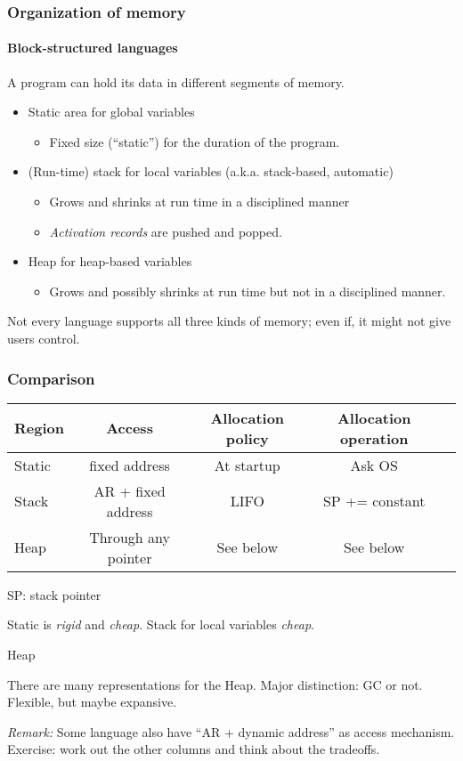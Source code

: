 \documentclass{beamer}
\newcommand{\Blue}[1]{\color{blue}#1\color{black}}
\begin{document}
\begin{frame}[fragile]
\frametitle{Organization of memory}
\framesubtitle{Block-structured languages}
A program can hold its data in different segments of memory.
\begin{itemize}
\item Static area for global variables
\begin{itemize}
\item Fixed size (``static'') for the duration of 
the program.
\end{itemize} 
\item (Run-time) stack for local variables (a.k.a. stack-based, automatic)
\begin{itemize}
\item  Grows and shrinks at run time in a disciplined
manner
\item  \emph{Activation records} are pushed and popped. 
\end{itemize}

\item Heap for heap-based variables
\begin{itemize}
\item Grows and possibly shrinks at run time but not
in a disciplined manner. 
\end{itemize}
\end{itemize}
Not every language supports all three kinds of memory; even if,
it might not give users control. 
\end{frame}


\begin{frame}[fragile]
\frametitle{Comparison}

{\small
\begin{tabular}{lcccc}
Region & Access        & Allocation policy & Allocation operation \\
\hline 
Static & fixed address & At startup & Ask OS \\
Stack  & AR + fixed address & LIFO & SP += constant \\
Heap   & Through any pointer & See below & See below \\
\hline
\end{tabular}
SP: stack pointer
}

\medskip

Static is \emph{rigid} and \emph{cheap}. Stack for local variables
\emph{cheap}. 


\bigskip

\Blue{Heap}
\smallskip

There are many representations for the Heap. Major distinction: GC or
not. Flexible, but maybe expansive.


\pause\bigskip

\emph{Remark:} Some language also have ``AR + dynamic address'' as access mechanism.
Exercise: work out the other columns and think about the tradeoffs.

\end{frame}
\end{document}
